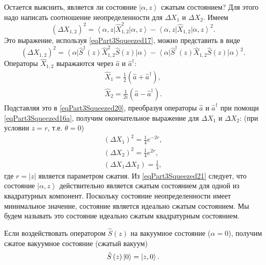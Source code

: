 Остается выяснить, является ли состояние $\left|\alpha, z\right>$
сжатым состоянием? Для этого надо написать соотношение
неопределенности для $\Delta X_1$  и $\Delta X_2$. Имеем
\begin{equation}
\left(\Delta X_{1,2}\right)^2 = 
\left<\alpha, z\right| \hat{X}_{1,2}^2\left|\alpha, z\right> -
\left<\alpha, z\right| \hat{X}_{1,2}\left|\alpha, z\right>^2.
\nonumber
\end{equation}
Это выражение, используя \eqref{eqPart3Squeezed17}, можно представить в
виде 
\begin{equation}
\left(\Delta X_{1,2}\right)^2 = 
\left<\alpha\right|\hat{S}^{\dag}\left(z\right) \hat{X}_{1,2}^2\hat{S}\left(z\right)\left|\alpha\right> -
\left<\alpha\right|\hat{S}^{\dag}\left(z\right) \hat{X}_{1,2}\hat{S}\left(z\right)\left|\alpha\right>^2.
\label{eqPart3Squeezed20}
\end{equation}
Операторы $\hat{X}_{1,2}$ выражаются через $\hat{a}$ и $\hat{a}^{\dag}$:
\begin{eqnarray}
\hat{X}_1 = \frac{1}{2}\left(\hat{a} + \hat{a}^{\dag}\right), 
\nonumber \\
\hat{X}_2 = \frac{1}{2 i}\left(\hat{a} - \hat{a}^{\dag}\right).
\nonumber
\end{eqnarray}
Подставляя это в \eqref{eqPart3Squeezed20}, преобразуя операторы
$\hat{a}$ и $\hat{a}^{\dag}$ при помощи \eqref{eqPart3Squeezed16a},
получим окончательное выражение для $\Delta X_1$  и $\Delta X_2$:
(при условии $z = r$, т.е. $\theta = 0$)
\begin{eqnarray}
\left(\Delta X_1\right)^2 = \frac{1}{4}e^{-2 r},
\nonumber \\
\left(\Delta X_2\right)^2 = \frac{1}{4}e^{2 r},
\nonumber \\
\left(\Delta X_1 \Delta X_2\right) = \frac{1}{4},
\label{eqPart3Squeezed21}
\end{eqnarray}
где $r = \left|z\right|$ является параметром сжатия. Из
\eqref{eqPart3Squeezed21} следует, что состояние $\left|\alpha,
z\right>$ действительно является сжатым состоянием для одной из
квадратурных компонент. Поскольку состояние неопределенности имеет
минимальное значение, состояние является идеально сжатым
состоянием. Мы будем называть это состояние идеально сжатым
квадратурным состоянием.

Если воздействовать оператором $\hat{S}\left(z\right)$ на вакуумное
состояние ($\alpha = 0$), получим сжатое вакуумное состояние (сжатый
вакуум)
\begin{equation}
\hat{S}\left(z\right)\ket{0} = \ket{z, 0}.
\nonumber
\end{equation}

